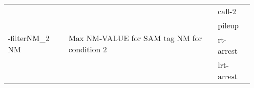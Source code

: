 {\small
\begin{tabular}{@{}p{}p{}l@{}}
\multirow{4}{=}{-filterNM\_2 NM} & \multirow{4}{=}{Max NM-VALUE for SAM tag NM for condition 2} & call-2 \\
 &  & pileup \\
 &  & rt-arrest \\
 &  & lrt-arrest \\
\end{tabular}\\
}
